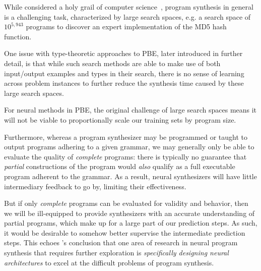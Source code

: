 \documentclass{article} %
\begin{document}
While considered a holy grail of computer science~\citep{gulwani2017program},
program synthesis in general is a challenging task, characterized by large search spaces,
e.g. a search space of $10^{5,943}$ programs to discover an expert implementation of the MD5 hash function.~\cite{gulwani2017program}


One issue with type-theoretic approaches to PBE, later introduced in further detail,
is that while such search methods are able to make use of both input/output examples and types in their search,
there is no sense of learning across problem instances to further reduce the synthesis time caused by these large search spaces.


For neural methods in PBE, the original challenge of large search spaces means
it will not be viable to proportionally scale our training sets by program size.

Furthermore, whereas a program synthesizer may be programmed or taught to output programs adhering to a given grammar,
we may generally only be able to evaluate the quality of \emph{complete} programs:
there is typically no guarantee that \emph{partial} constructions of the program would \emph{also} qualify as a full executable program adherent to the grammar.
As a result, neural synthesizers will have little intermediary feedback to go by, limiting their effectiveness.

But if only \emph{complete} programs can be evaluated for validity and behavior, then 
we will be ill-equipped to provide synthesizers with an accurate understanding of partial programs,
which make up for a large part of our prediction steps.
As such, it would be desirable to somehow better supervise the intermediate prediction steps.
This echoes \citet{nps}'s conclusion that one area of research in neural program synthesis that requires further exploration is
\emph{specifically designing neural architectures} to excel at the difficult problems of program synthesis.
\end{document}
